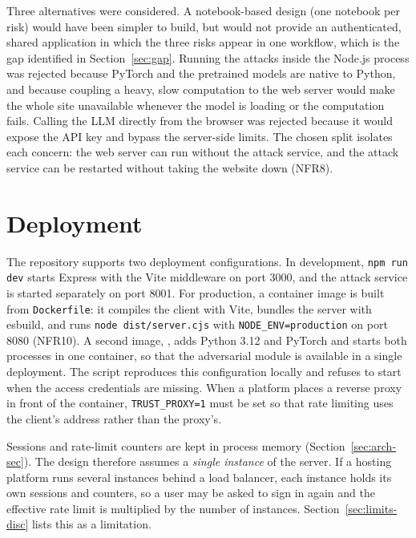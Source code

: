 Three alternatives were considered. A notebook-based design (one notebook per risk) would have been simpler to build, but would not provide an authenticated, shared application in which the three risks appear in one workflow, which is the gap identified in Section~\ref{sec:gap}. Running the attacks inside the Node.js process was rejected because PyTorch and the pretrained models are native to Python, and because coupling a heavy, slow computation to the web server would make the whole site unavailable whenever the model is loading or the computation fails. Calling the LLM directly from the browser was rejected because it would expose the API key and bypass the server-side limits. The chosen split isolates each concern: the web server can run without the attack service, and the attack service can be restarted without taking the website down (NFR8).

\section{Deployment}
\label{sec:deploy}

The repository supports two deployment configurations. In development, \texttt{npm run dev} starts Express with the Vite middleware on port 3000, and the attack service is started separately on port 8001. For production, a container image is built from \texttt{Dockerfile}: it compiles the client with Vite, bundles the server with esbuild, and runs \texttt{node dist/server.cjs} with \texttt{NODE\_ENV=production} on port 8080 (NFR10). A second image, , adds Python 3.12 and PyTorch and starts both processes in one container, so that the adversarial module is available in a single deployment. The script  reproduces this configuration locally and refuses to start when the access credentials are missing. When a platform places a reverse proxy in front of the container, \texttt{TRUST\_PROXY=1} must be set so that rate limiting uses the client's address rather than the proxy's.

Sessions and rate-limit counters are kept in process memory (Section~\ref{sec:arch-sec}). The design therefore assumes a \emph{single instance} of the server. If a hosting platform runs several instances behind a load balancer, each instance holds its own sessions and counters, so a user may be asked to sign in again and the effective rate limit is multiplied by the number of instances. Section~\ref{sec:limits-disc} lists this as a limitation.

